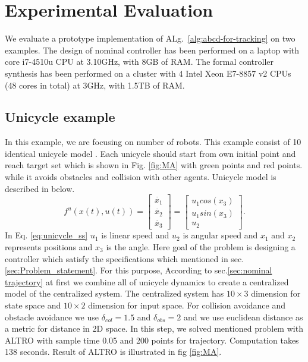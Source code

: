 
\section{Experimental Evaluation}\label{sec:experiments}
We evaluate a prototype implementation of ALg.~\ref{alg:abcd-for-tracking}
on two examples. 
The design of nominal controller has been performed on a laptop with core i7-4510u CPU at 3.10GHz, with 8GB of
RAM.
The formal controller synthesis has been performed
on a cluster with 4 Intel Xeon E7-8857 v2 CPUs (48 cores in total) at 3GHz, with 1.5TB of
RAM.

\subsection{Unicycle example}\label{sec:MultiAgent}
In this example, we are focusing on number of robots. This example consist of 10 identical unicycle model . Each unicycle should start from own initial point and reach target set which is shown in Fig. \ref{fig:MA} with green points and red points. while it avoids obstacles and collision with other agents. Unicycle model is described in below.
\begin{equation}\label{eq:unicycle_ss}
	f^{u}(x(t),u(t))=
	\begin{bmatrix}
	\dot{x_1}\\
	\dot{x_2}\\
	\dot{x_3}
	\end{bmatrix}=
	\begin{bmatrix}
	u_1cos(x_3)\\
	u_1sin(x_3)\\
	u_2
	\end{bmatrix}.
\end{equation}
In Eq. \ref{eq:unicycle_ss} $u_1$ is linear speed and $u_2$ is  angular speed and $x_1$ and $x_2$ represents positions and $x_3$ is the angle. Here goal of the problem is designing a controller which satisfy the specifications which mentioned in sec. \ref{sec:Problem_statement}. For this purpose, According to sec.\ref{sec:nominal trajectory} at first we combine all of unicycle dynamics to create a centralized model of the centralized system. The centralized system has $10\times3$ dimension for state space and $10\times2$ dimension for input space. For collision avoidance and obstacle avoidance we use $\delta_{col}=1.5$ and $\delta_{obs}=2$ and we use euclidean distance as a metric for distance in 2D space. In this step, we solved mentioned problem with ALTRO with sample time 0.05 and 200 points for trajectory. Computation takes 138 seconds. Result of ALTRO is illustrated in fig \ref{fig:MA}. 

